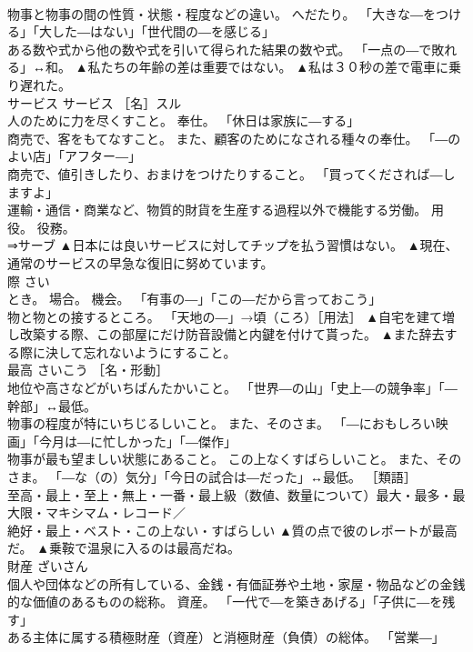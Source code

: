 \documentclass[8pt]{extreport}
\begin{document}
\begin{CJK}{UTF8}{min}
\\	物事と物事の間の性質・状態・程度などの違い。 へだたり。 「大きな―をつける」「大した―はない」「世代間の―を感じる」 
\\	ある数や式から他の数や式を引いて得られた結果の数や式。 「一点の―で敗れる」↔和。	▲私たちの年齢の差は重要ではない。 ▲私は３０秒の差で電車に乗り遅れた。
\\	サービス	サービス	［名］スル 
\\	人のために力を尽くすこと。 奉仕。 「休日は家族に―する」 
\\	商売で、客をもてなすこと。 また、顧客のためになされる種々の奉仕。 「―のよい店」「アフター―」 
\\	商売で、値引きしたり、おまけをつけたりすること。 「買ってくだされば―しますよ」 
\\	運輸・通信・商業など、物質的財貨を生産する過程以外で機能する労働。 用役。 役務。 
\\	⇒サーブ	▲日本には良いサービスに対してチップを払う習慣はない。 ▲現在、通常のサービスの早急な復旧に努めています。
\\	際	さい	
\\	とき。 場合。 機会。 「有事の―」「この―だから言っておこう」 
\\	物と物との接するところ。 「天地の―」→頃（ころ）［用法］	▲自宅を建て増し改築する際、この部屋にだけ防音設備と内鍵を付けて貰った。 ▲また辞去する際に決して忘れないようにすること。
\\	最高	さいこう	［名・形動］ 
\\	地位や高さなどがいちばんたかいこと。 「世界―の山」「史上―の競争率」「―幹部」↔最低。 
\\	物事の程度が特にいちじるしいこと。 また、そのさま。 「―におもしろい映画」「今月は―に忙しかった」「―傑作」 
\\	物事が最も望ましい状態にあること。 この上なくすばらしいこと。 また、そのさま。 「―な（の）気分」「今日の試合は―だった」↔最低。 ［類語］
\\	至高・最上・至上・無上・一番・最上級（数値、数量について）最大・最多・最大限・マキシマム・レコード／
\\	絶好・最上・ベスト・この上ない・すばらしい	▲質の点で彼のレポートが最高だ。 ▲乗鞍で温泉に入るのは最高だね。
\\	財産	ざいさん	
\\	個人や団体などの所有している、金銭・有価証券や土地・家屋・物品などの金銭的な価値のあるものの総称。 資産。 「一代で―を築きあげる」「子供に―を残す」 
\\	ある主体に属する積極財産（資産）と消極財産（負債）の総体。 「営業―」 

\end{CJK}
\end{document}
